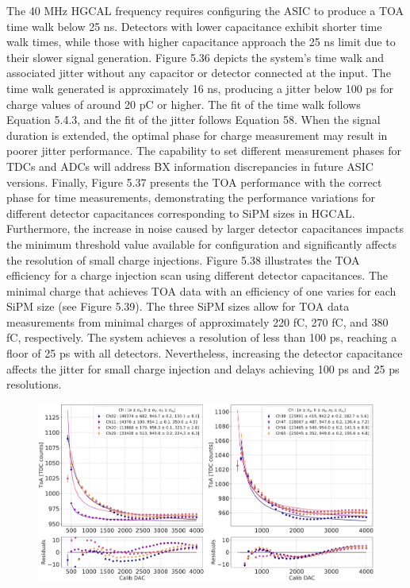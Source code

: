 The 40 MHz HGCAL frequency requires configuring the ASIC to produce a TOA time walk below 25 ns. Detectors with lower capacitance exhibit shorter time walk times, while those with higher capacitance approach the 25 ns limit due to their slower signal generation. Figure 5.36 depicts the system’s time walk and associated jitter without any capacitor or detector connected at the input. The time walk generated is approximately 16 ns, producing a jitter below 100 ps for charge values of around 20 pC or higher. The fit of the time walk follows Equation 5.4.3, and the fit of the jitter follows Equation 58.
When the signal duration is extended, the optimal phase for charge measurement may result in poorer jitter performance. The capability to set different measurement phases for TDCs and ADCs will address BX information discrepancies in future ASIC versions. Finally, Figure 5.37 presents the TOA performance with the correct phase for time measurements, demonstrating the performance variations for different detector capacitances corresponding to SiPM sizes in HGCAL.
Furthermore, the increase in noise caused by larger detector capacitances impacts the minimum threshold value available for configuration and significantly affects the resolution of small charge injections. Figure 5.38 illustrates the TOA efficiency for a charge injection scan using different detector capacitances. The minimal charge that achieves TOA data with an efficiency of one varies for each SiPM size (see Figure 5.39). The three SiPM sizes allow for TOA data measurements from minimal charges of approximately 220 fC, 270 fC, and 380 fC, respectively. The system achieves a resolution of less than 100 ps, reaching a floor of 25 ps with all detectors. Nevertheless, increasing the detector capacitance affects the jitter for small charge injection and delays achieving 100 ps and 25 ps resolutions.

\begin{figure}
    \centering
    \includegraphics[width=0.75\linewidth]{Figures/HGCAL/TOA_Injection.pdf}
    \caption{}
    \label{fig:TOA_Injection}
\end{figure}

